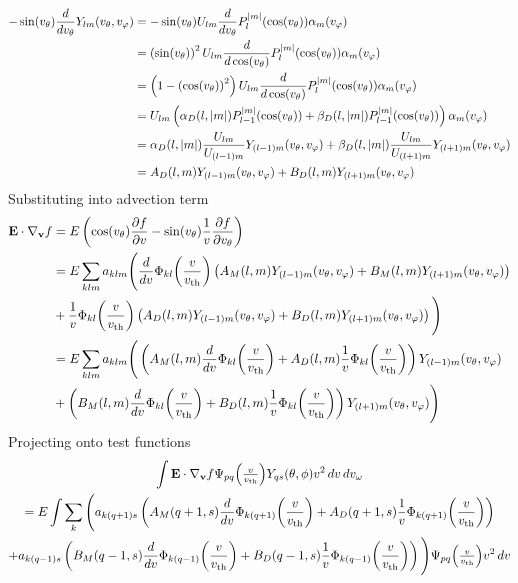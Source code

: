 \documentclass{article}[draft]
\begin{document}
\begin{align*}
-\sin\of{\vtheta} \frac{d}{d\vtheta} Y_{lm}\of{\vtheta,\vphi}
&=
-\sin\of{\vtheta} U_{lm} \frac{d}{d\vtheta} P^{|m|}_l\of{\cos\of{\vtheta}} \alpha_m\of{\vphi}
\\
&=
\left(\sin\of{\vtheta}\right)^2 U_{lm} \frac{d}{d\cos\of{\vtheta}} P^{|m|}_l\of{\cos\of{\vtheta}} \alpha_m\of{\vphi}
\\
&=
\left(1 - \left(\cos\of{\vtheta}\right)^2\right) U_{lm} \frac{d}{d\cos\of{\vtheta}} P^{|m|}_l\of{\cos\of{\vtheta}} \alpha_m\of{\vphi}
\\
&=
U_{lm} \left( \alpha_D\of{l,|m|} P^{|m|}_{l-1}\of{\cos\of{\vtheta}} 
+ \beta_D\of{l,|m|} P^{|m|}_{l-1}\of{\cos\of{\vtheta}} \right) \alpha_m\of{\vphi}
\\
&=
\alpha_D\of{l,|m|} \frac{U_{lm}}{U_{(l-1)m}} Y_{(l-1)m}\of{\vtheta,\vphi} 
+ \beta_D\of{l,|m|} \frac{U_{lm}}{U_{(l+1)m}} Y_{(l+1)m}\of{\vtheta,\vphi}
\\
&=
A_D\of{l,m} Y_{(l-1)m}\of{\vtheta,\vphi} 
+ 
B_D\of{l,m} Y_{(l+1)m}\of{\vtheta,\vphi}
\end{align*}
Substituting into advection term
\begin{align*}
\vect{E}\cdot \nabla_{\vect{v}} f
&= E 
\left( \cos\of{\vtheta} \frac{\partial f}{\partial \vr} 
- \sin\of{\vtheta} \frac{1}{\vr} \frac{\partial f}{\partial \vtheta} \right)
\\
&= E 
\sum_{klm} a_{klm} 
\Bigg(
\frac{d}{d\vr}\Phi_{kl}\of{\frac{v}{\vth}}
\left( A_M\of{l,m} Y_{(l-1)m}\of{\vtheta,\vphi} 
+ B_M\of{l,m} Y_{(l+1)m}\of{\vtheta,\vphi} \right)
\\
&+
\frac{1}{\vr}\Phi_{kl}\of{\frac{v}{\vth}}
\left( A_D\of{l,m} Y_{(l-1)m}\of{\vtheta,\vphi} 
+ B_D\of{l,m} Y_{(l+1)m}\of{\vtheta,\vphi} \right) 
\Bigg)
\\
&= E 
\sum_{klm} a_{klm} 
\Bigg(
\left( A_M\of{l,m} \frac{d}{d\vr}\Phi_{kl}\of{\frac{v}{\vth}} 
+ A_D\of{l,m} \frac{1}{\vr}\Phi_{kl}\of{\frac{v}{\vth}} \right)
Y_{(l-1)m}\of{\vtheta,\vphi} 
\\
&+
\left( B_M\of{l,m} \frac{d}{d\vr}\Phi_{kl}\of{\frac{v}{\vth}} 
+ B_D\of{l,m} \frac{1}{\vr}\Phi_{kl}\of{\frac{v}{\vth}} \right)
Y_{(l+1)m}\of{\vtheta,\vphi} 
\Bigg)
\end{align*}
Projecting onto test functions
\begin{multline*}
\myint \vect{E}\cdot \nabla_{\vect{v}} f \Psi_{pq}\of{\textstyle\frac{\vr}{\vth}} Y_{qs}\of{\theta,\phi} 
\vr^2 \diff{\vr} \diff{\vomega}\\
= E 
\myint 
\sum_{k}
\Bigg(
a_{k(q+1)s} 
\left( A_M\of{q+1,s} \frac{d}{d\vr}\Phi_{k(q+1)}\of{\frac{v}{\vth}} 
+ A_D\of{q+1,s} \frac{1}{\vr}\Phi_{k(q+1)}\of{\frac{v}{\vth}} \right)
\\
+ a_{k(q-1)s} \left( B_M\of{q-1,s} \frac{d}{d\vr}\Phi_{k(q-1)}\of{\frac{v}{\vth}} 
+ B_D\of{q-1,s} \frac{1}{\vr}\Phi_{k(q-1)}\of{\frac{v}{\vth}} \right)
\Bigg)
\Psi_{pq}\of{\textstyle\frac{\vr}{\vth}}
\vr^2 \diff{\vr}
\end{multline*}
\end{document}
